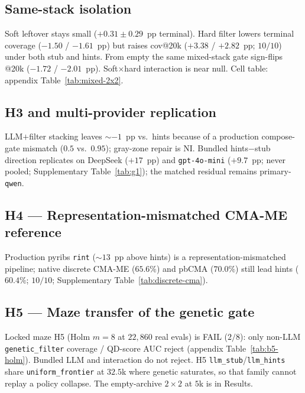 \documentclass[preprint,12pt]{elsarticle}
\begin{document}
\subsection{Same-stack isolation}
\label{sec:mixed-2x2}

Soft leftover stays small ($+0.31\pm0.29$~pp terminal). Hard filter lowers terminal coverage ($-1.50$ / $-1.61$~pp) but raises cov@20k ($+3.38$ / $+2.82$~pp; $10/10$) under both stub and hints. From empty the same mixed-stack gate sign-flips @20k ($-1.72$ / $-2.01$~pp). Soft$\times$hard interaction is near null. Cell table: appendix Table~\ref{tab:mixed-2x2}.

\subsection{H3 and multi-provider replication}
\label{sec:h3}
\label{sec:multi-llm}

LLM$+$filter stacking leaves ${\sim}{-}1$~pp vs.\ hints because of a production compose-gate mismatch ($0.5$ vs.\ $0.95$); gray-zone repair is NI. Bundled hints$-$stub direction replicates on DeepSeek ($+17$~pp) and \texttt{gpt-4o-mini} ($+9.7$~pp; never pooled; Supplementary Table~\ref{tab:g1}); the matched residual remains primary-\texttt{qwen}.

\subsection{H4 --- Representation-mismatched CMA-ME reference}
\label{sec:h4}

Production pyribs \texttt{rint} (${\sim}13$~pp above hints) is a representation-mismatched pipeline; native discrete CMA-ME ($65.6\%$) and pbCMA ($70.0\%$) still lead hints ($60.4\%$; $10/10$; Supplementary Table~\ref{tab:discrete-cma}).

\subsection{H5 --- Maze transfer of the genetic gate}
\label{sec:h5}
\label{sec:h5-maze}

Locked maze H5 (Holm $m{=}8$ at $22{,}860$ real evals) is FAIL ($2/8$): only non-LLM \texttt{genetic\_filter} coverage / QD-score AUC reject (appendix Table~\ref{tab:b5-holm}). Bundled LLM and interaction do not reject. H5 \texttt{llm\_stub}/\texttt{llm\_hints} share \texttt{uniform\_frontier} at $32.5$k where genetic saturates, so that family cannot replay a policy collapse. The empty-archive $2\times2$ at $5$k is in Results.
\end{document}
